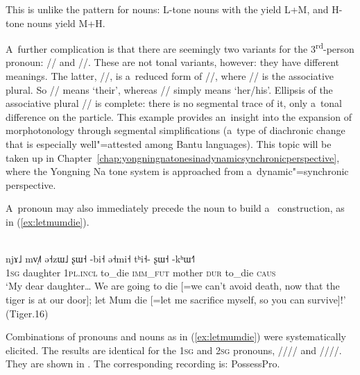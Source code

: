 This is unlike the pattern for nouns: L-tone nouns with the  yield L+M, and H-tone nouns yield M+H.

A~further complication is that there are seemingly two variants for the
3\textsuperscript{rd}-person pronoun: // and //. These
are not tonal variants, however: they have different meanings. The latter, //, is
a~reduced form of //, where // is the associative plural. So
// means ‘their’, whereas // simply means ‘her/his’. Ellipsis of the
associative plural // is complete: there is no segmental trace of it, only a~tonal
difference on the  particle. This example provides an~insight into the expansion of morphotonology through segmental
simplifications (a~type of {diachronic} change that is especially well"=attested among {Bantu} languages). This
topic will be taken up in Chapter~\ref{chap:yongningnatonesinadynamicsynchronicperspective}, where the Yongning Na tone system is approached from a~dynamic"=synchronic perspective.

A~pronoun may also immediately precede the noun to build a~ construction, as in (\ref{ex:letmumdie}).

\Hack{\newpage}

\begin{exe}
  \ex
  \label{ex:letmumdie}
  \\
  \gll njɤ˩		mv̩˩˥		ə˧zɯ˩		ʂɯ˧	-bi˧	ə˧mi˧	tʰi˧-	ʂɯ˧		-kʰɯ˧˥\\
  1\textsc{sg}		daughter	1\textsc{pl}.\textsc{incl}		to\_die	\textsc{imm\_fut}	mother	\textsc{dur}	to\_die	\textsc{caus}\\
  \glt ‘My dear daughter{\dots}  We are going to die [=we can’t avoid death, now that the tiger is
    at our door]; let Mum die [=let me sacrifice myself, so you can survive]!' (Tiger.16)
\end{exe}

Combinations of pronouns and nouns as in (\ref{ex:letmumdie}) were systematically elicited. The
results are identical for the 1\textsc{sg} and 2\textsc{sg} pronouns, //// and
////. They are shown in . The corresponding recording is: PossessPro.

